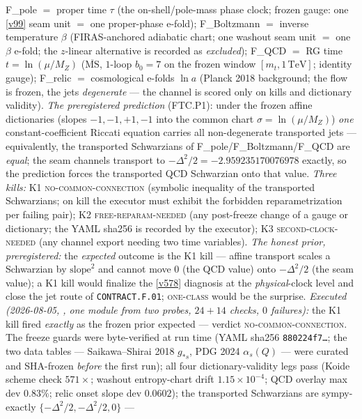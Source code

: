 \documentclass[11pt,a4paper]{article}
\begin{document}
F\_pole $=$ proper time $\tau$ (the on-shell/pole-mass phase clock;
frozen gauge: one \vref{v99} seam unit $=$ one proper-phase e-fold);
F\_Boltzmann $=$ inverse temperature $\beta$ (FIRAS-anchored
adiabatic chart; one washout seam unit $=$ one $\beta$ e-fold; the
$z$-linear alternative is recorded as \emph{excluded});
F\_QCD $=$ RG time $t=\ln(\mu/M_Z)$ ($\overline{\mathrm{MS}}$,
$1$-loop $b_0=7$ on the
frozen window $[m_t,1\,\mathrm{TeV}]$; identity gauge);
F\_relic $=$ cosmological e-folds $\ln a$ (Planck 2018 background;
the flow is frozen, the jets \emph{degenerate} --- the channel is
scored only on kills and dictionary validity).  \emph{The
preregistered prediction} (FTC.P1): under the frozen affine
dictionaries (slopes $-1,-1,+1,-1$ into the common chart
$\sigma=\ln(\mu/M_Z)$) \emph{one} constant-coefficient Riccati
equation carries all non-degenerate transported jets ---
equivalently, the transported Schwarzians of
F\_pole/F\_Boltzmann/F\_QCD are \emph{equal}; the seam channels
transport to $-\Delta^2/2=-2.959235170076978$ exactly, so the
prediction forces the transported QCD Schwarzian onto that value.
\emph{Three kills:} K1 \textsc{no-common-connection} (symbolic
inequality of the transported Schwarzians; on kill the executor must
exhibit the forbidden reparametrization per failing pair); K2
\textsc{free-reparam-needed} (any post-freeze change of a gauge or
dictionary; the YAML sha256 is recorded by the executor); K3
\textsc{second-clock-needed} (any channel export needing two time
variables).  \emph{The honest prior, preregistered:} the
\emph{expected} outcome is the K1 kill --- affine transport scales a
Schwarzian by $\mathrm{slope}^2$ and cannot move $0$ (the QCD value)
onto $-\Delta^2/2$ (the seam value); a K1 kill would finalize the
\vref{v578} diagnosis at the \emph{physical}-clock level and close
the jet route of \texttt{CONTRACT.F.01}; \textsc{one-class} would be
the surprise.  \emph{Executed (2026-08-05,
, one module from two probes,
$24+14$ checks, $0$ failures):} the K1 kill fired \emph{exactly} as
the frozen prior expected --- verdict \textsc{no-common-connection}.
The freeze guards were byte-verified at run time (YAML sha256
\texttt{880224f7\ldots}; the two data tables --- Saikawa--Shirai
2018 $g_{*s}$, PDG 2024 $\alpha_s(Q)$ --- were curated and
SHA-frozen \emph{before} the first run); all four
dictionary-validity legs pass (Koide scheme check $571\times$;
washout entropy-chart drift $1.15\times10^{-4}$; QCD overlay max
dev $0.83\%$; relic onset slope dev $0.0602$); the transported
Schwarzians are sympy-exactly $\{-\Delta^2/2,-\Delta^2/2,0\}$ ---
\end{document}
